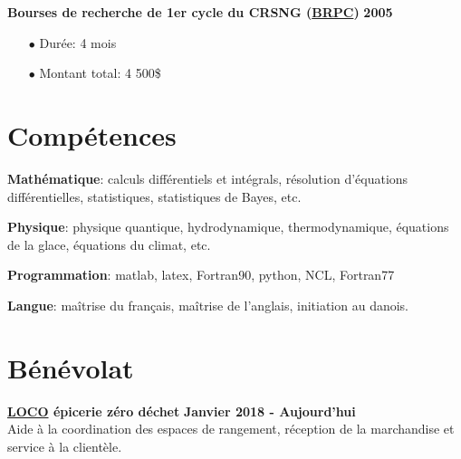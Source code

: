 \documentclass[paper=letter,fontsize=11pt]{scrartcl} %
\begin{document}
\vspace{0.25\baselineskip}

\noindent \textbf{Bourses de recherche de 1er cycle du CRSNG (\href{http://www.nserc-crsng.gc.ca/Students-Etudiants/UG-PC/USRA-BRPC_fra.asp}{BRPC})} \hfill \textbf{2005}
\begin{itemize}
\item[$\bullet$] Durée: 4 mois
\item[$\bullet$] Montant total: 4 500\$
\end{itemize}



\section*{Compétences}

\noindent \textbf{Mathématique}: calculs différentiels et intégrals, résolution d'équations différentielles, statistiques, statistiques de Bayes, etc.

\vspace{0.5\baselineskip}

\noindent \textbf{Physique}: physique quantique, hydrodynamique, thermodynamique, équations de la glace, équations du climat, etc.

\vspace{0.5\baselineskip}

\noindent \textbf{Programmation}: matlab, latex, Fortran90, python, NCL, Fortran77
 
\vspace{0.5\baselineskip}

\noindent \textbf{Langue}: maîtrise du français, maîtrise de l'anglais, initiation au danois. 


\section*{Bénévolat}

\noindent \textbf{\href{https://www.epicerieloco.ca}{LOCO} épicerie zéro déchet} \hfill \textbf{Janvier 2018 - Aujourd'hui}\\
 Aide à la coordination des espaces de rangement, réception de la marchandise et service à la clientèle. 


\end{document}
